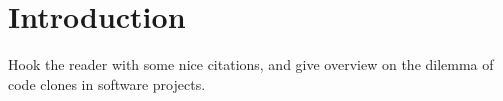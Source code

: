 
\section{Introduction}
\label{sec:intro}

Hook the reader with some nice citations, and give overview on the dilemma of code clones in software projects.